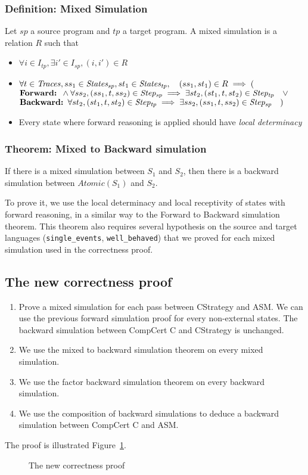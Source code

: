 \subsubsection{Definition: Mixed Simulation} Let $sp$ a source program and $tp$ a target program. A mixed simulation is a relation $R$ such that
\begin{itemize}
\item $\forall i\in I_{tp}, \exists i'\in I_{sp}, (i,i')\in R$
\item $\forall t\in\mathit{Traces}, ss_1\in\mathit{States_{sp}},st_1\in\mathit{States_{tp}},\quad(ss_1,st_1)\in R\implies ($\\
      $\textbf{Forward: }\wedge\forall ss_2, (ss_1,t,ss_2)\in\mathit{Step_{sp}}\implies\exists st_2, (st_1,t,st_2)\in\mathit{Step_{tp}}  \quad\vee$\\
      $\textbf{Backward: }\forall st_2, (st_1,t,st_2)\in\mathit{Step_{tp}}\implies\exists ss_2, (ss_1,t,ss_2)\in\mathit{Step_{sp}} \quad)$
\item Every state where forward reasoning is applied should have \textit{local determinacy}
\end{itemize}

\mixed

\subsubsection{Theorem: Mixed to Backward simulation}
If there is a mixed simulation between $S_1$ and $S_2$, then there is a backward simulation between $\mathit{Atomic}(S_1)$ and $S_2$.

To prove it, we use the local determinacy and local receptivity of states with forward reasoning, in a similar way to the Forward to Backward simulation theorem. This theorem also requires several hypothesis on the source and target languages (\texttt{single\_events}, \texttt{well\_behaved}) that we proved for each mixed simulation used in the correctness proof.

\subsection{The new correctness proof}
\begin{enumerate}
\item Prove a mixed simulation for each pass between CStrategy and ASM. We can use the previous forward simulation proof for every non-external states. The backward simulation between CompCert C and CStrategy is unchanged.
\item We use the mixed to backward simulation theorem on every mixed simulation.
\item We use the factor backward simulation theorem on every backward simulation.
\item We use the composition of backward simulations to deduce a backward simulation between CompCert C and ASM.
\end{enumerate}

The proof is illustrated Figure~\ref{fig:mixedproof}.

\begin{figure}
  \makebox[\textwidth][c]{\mixedproof}
  \caption{The new correctness proof}
  \label{fig:mixedproof}
\end{figure}
